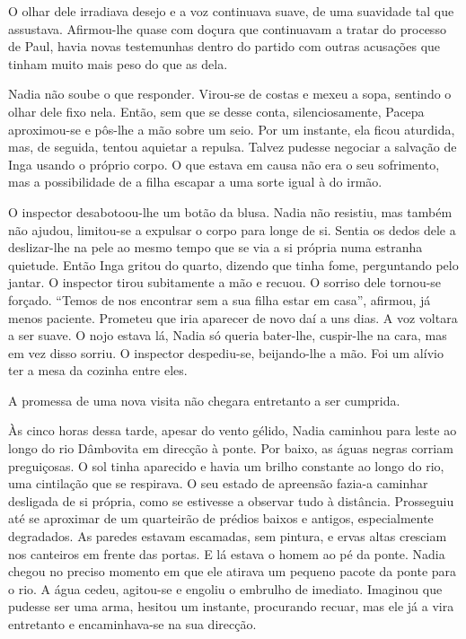 O olhar dele irradiava desejo e a voz continuava suave, de uma suavidade
tal que assustava. Afirmou-lhe quase com doçura que continuavam a tratar
do processo de Paul, havia novas testemunhas dentro do partido com
outras acusações que tinham muito mais peso do que as dela.

Nadia não soube o que responder. Virou-se de costas e mexeu a sopa,
sentindo o olhar dele fixo nela. Então, sem que se desse conta,
silenciosamente, Pacepa aproximou-se e pôs-lhe a mão sobre um seio. Por
um instante, ela ficou
aturdida, mas, de seguida, tentou aquietar a repulsa. Talvez pudesse
negociar a salvação de Inga usando o próprio corpo. O que estava em
causa não era o seu sofrimento, mas a possibilidade de a filha escapar a
uma sorte igual à do irmão.

O inspector desabotoou-lhe um botão da blusa. Nadia não resistiu, mas
também não ajudou, limitou-se a expulsar o corpo para longe de si.
Sentia os dedos dele a deslizar-lhe na pele ao mesmo tempo que se via a si própria numa estranha
quietude. Então Inga gritou do quarto, dizendo que tinha fome,
perguntando pelo jantar. O inspector tirou subitamente a mão e recuou. O
sorriso dele tornou-se forçado. ``Temos de nos encontrar sem a sua
filha estar em casa'', afirmou, já menos paciente. Prometeu que iria
aparecer de novo daí a uns dias. A voz voltara a ser suave. O nojo
estava lá, Nadia só queria bater-lhe, cuspir-lhe na cara, mas em vez
disso sorriu. O inspector despediu-se, beijando-lhe a mão. Foi um alívio
ter a mesa da cozinha entre eles.

A promessa de uma nova visita não chegara entretanto a ser cumprida.

Às cinco horas dessa tarde, apesar do vento gélido, Nadia caminhou para
leste ao longo do rio Dâmbovita em direcção à ponte. Por baixo, as águas
negras corriam preguiçosas. O sol tinha aparecido e havia um brilho
constante ao longo do rio, uma cintilação que se respirava. O seu
estado de apreensão fazia-a caminhar desligada de si própria, como se
estivesse a observar tudo à distância. Prosseguiu até se aproximar de um
quarteirão de prédios
baixos e antigos, especialmente degradados. As paredes estavam
escamadas, sem pintura, e ervas altas cresciam nos canteiros em frente
das portas. E lá estava o homem ao pé da ponte. Nadia chegou no preciso
momento em que ele atirava um pequeno pacote da ponte para o rio. A água
cedeu, agitou-se e engoliu o embrulho de imediato. Imaginou que
pudesse ser uma arma, hesitou um instante, procurando recuar, mas ele
já a vira entretanto e encaminhava-se na sua direcção.

